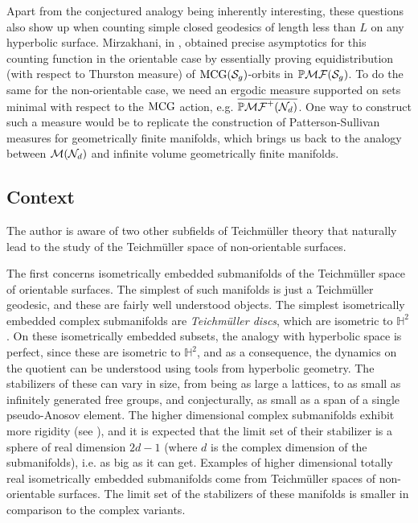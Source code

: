 \documentclass[12pt, reqno]{amsart}
\begin{document}
Apart from the conjectured analogy being inherently interesting, these questions also show up when counting simple closed geodesics of length less than $L$ on any hyperbolic surface. Mirzakhani, in \autocite{mirzakhani2008growth}, obtained precise asymptotics for this counting function in the orientable case by essentially proving equidistribution (with respect to Thurston measure) of $\mathrm{MCG}(\mathcal{S}_{g})$-orbits in $\mathbb{P}\mathcal{MF}(\mathcal{S}_g)$.
To do the same for the non-orientable case, we need an ergodic measure supported on sets
minimal with respect to the $\mathrm{MCG}$ action, e.g. $\overline{\mathbb{P}\mathcal{MF}^+(\mathcal{N}_d)}$.
One way to construct such a measure would be to replicate the construction of Patterson-Sullivan measures for geometrically finite manifolds, which brings us back
to the analogy between $\mathcal{M}(\mathcal{N}_d)$ and infinite volume geometrically finite manifolds.

\subsection*{Context}

The author is aware of two other subfields of Teichm\"uller theory that naturally lead to the study of the Teichm\"uller space of non-orientable surfaces.

The first concerns isometrically embedded submanifolds of the Teichm\"uller space of orientable surfaces.
The simplest of such manifolds is just a Teichm\"uller geodesic, and these are fairly well
understood objects.
The simplest isometrically embedded complex submanifolds are \emph{Teichm\"uller
  discs}, which are isometric to $\mathbb{H}^2$.
On these isometrically embedded subsets, the analogy with hyperbolic space is perfect, since these are isometric to $\mathbb{H}^2$, and as a consequence, the dynamics on the quotient can be understood using tools from hyperbolic geometry.
The stabilizers of these can vary in size, from being as large a lattices, to as small as infinitely generated free groups, and conjecturally, as small as a span of a single pseudo-Anosov element.
The higher dimensional complex submanifolds exhibit more rigidity (see \cite{wright2020}), and it is expected that the limit set of their stabilizer is a sphere of real dimension $2d-1$ (where $d$ is the complex dimension of the submanifolds), i.e. as big as it can get. Examples of higher dimensional totally real isometrically embedded submanifolds come from Teichm\"uller spaces of non-orientable surfaces.
The limit set of the stabilizers of these manifolds is smaller in comparison to the complex variants.
\end{document}
